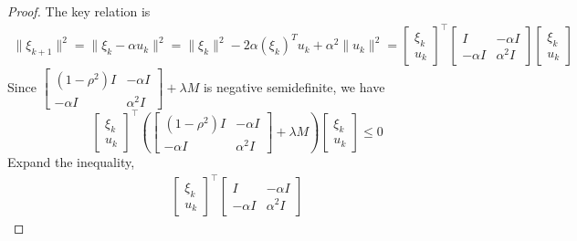 \documentclass[11pt]{elegantbook}
\begin{document}
\begin{proof}
The key relation is
\begin{equation}
    \begin{aligned}
        \|\xi_{k+1}\|^2=\|\xi_k-\alpha u_k\|^2=\|\xi_k\|^2-2\alpha (\xi_k)^T u_k+\alpha^2\|u_k\|^2=
        \left[\begin{array}{l}
            \xi_{k} \\
            u_{k}
        \end{array}\right]^{\top} 
        \begin{bmatrix}
            I&	-\alpha I\\
            -\alpha I&	\alpha^2 I
        \end{bmatrix}
        \left[\begin{array}{l}
            \xi_{k} \\
            u_{k}
        \end{array}\right]
    \end{aligned}
    \nonumber
\end{equation}
Since $\left[\begin{array}{cc}
\left(1-\rho^{2}\right) I & -\alpha I \\
-\alpha I & \alpha^{2} I
\end{array}\right]+\lambda M$ is negative semidefinite, we have
$$\left[\begin{array}{l}
    \xi_{k} \\
    u_{k}
\end{array}\right]^{\top}
\left( \left[\begin{array}{cc}
    \left(1-\rho^{2}\right) I & -\alpha I \\
    -\alpha I & \alpha^{2} I
    \end{array}\right]+\lambda M\right)
    \left[\begin{array}{l}
        \xi_{k} \\
        u_{k}
    \end{array}\right]\leq 0$$
Expand the inequality,
\begin{equation}
    \begin{aligned}
        \left[\begin{array}{l}
            \xi_{k} \\
            u_{k}
        \end{array}\right]^{\top}
        \left[\begin{array}{cc}
            I & -\alpha I \\
            -\alpha I & \alpha^{2} I
            \end{array}\right]

\end{aligned}
\end{equation}
\end{proof}
\end{document}
